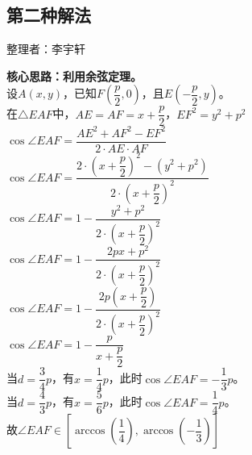 \documentclass[UTF8]{ctexart}
\begin{document}
\subsection{第二种解法}
    \begin{center}
        整理者：李宇轩
    \end{center}
    \begin{multicols}{2}
        \small
        \textbf{核心思路：利用余弦定理。}\\[5mm]
        设$A(x,y)$，已知$F\left(\dfrac{p}{2},0\right)$，且$E\left(-\dfrac{p}{2},y\right)$。\\[5mm]
        在$\triangle EAF$中，$AE=AF=x+\dfrac{p}{2}$，$EF^2=y^2+p^2$\\[5mm]
        $\cos{\angle EAF}=\dfrac{AE^2+AF^2-EF^2}{2\cdot AE\cdot AF}$\\[5mm]
        $\cos{\angle EAF}=\dfrac{2\cdot\left(x+\dfrac{p}{2}\right)^2-\left(y^2+p^2\right)}{2\cdot\left(x+\dfrac{p}{2}\right)^2}$\\[5mm]
        $\cos{\angle EAF}=1-\dfrac{y^2+p^2}{2\cdot\left(x+\dfrac{p}{2}\right)^2}$\\[5mm]
        $\cos{\angle EAF}=1-\dfrac{2px+p^2}{2\cdot\left(x+\dfrac{p}{2}\right)^2}$\\[5mm]
        $\cos{\angle EAF}=1-\dfrac{2p\left(x+\dfrac{p}{2}\right)}{2\cdot\left(x+\dfrac{p}{2}\right)^2}$\\[5mm]
        $\cos{\angle EAF}=1-\dfrac{p}{x+\dfrac{p}{2}}$\\[5mm]
        当$d=\dfrac{3}{4}p$，有$x=\dfrac{1}{4}p$，此时$\cos{\angle EAF}=-\dfrac{1}{3}p$。\\[5mm]
        当$d=\dfrac{4}{3}p$，有$x=\dfrac{5}{6}p$，此时$\cos{\angle EAF}=\dfrac{1}{4}p$。\\[5mm]
        故$\angle EAF\in\left[\arccos{\left(\dfrac{1}{4}\right)},\arccos{\left(-\dfrac{1}{3}\right)}\right]$
        \newpage
    \end{multicols}

\newpage
\end{document}
